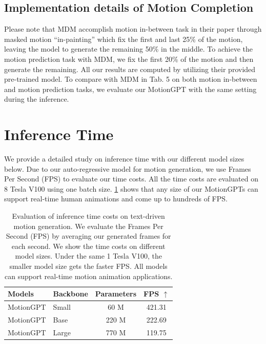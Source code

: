 \subsection{Implementation details of Motion Completion}
\label{sec:appendix:reimplement}
Please note that MDM\cite{mdm2022human} accomplish motion in-between task in their paper through masked motion “in-painting” which fix the first and last 25\% of the motion, leaving the model to generate the remaining 50\% in the middle. To achieve the motion prediction task with MDM, we fix the first 20\% of the motion and then generate the remaining. All our results are computed by utilizing their provided pre-trained model. To compare with MDM in Tab. 5 on both motion in-between and motion prediction tasks, we evaluate our MotionGPT with the same setting during the inference.


\section{Inference Time}
\label{sec:inferencetime}
%
We provide a detailed study on inference time with our different model sizes below. Due to our auto-regressive model for motion generation, we use Frames Per Second (FPS) to evaluate our time costs. All the time costs are evaluated on 8 Tesla V100 using one batch size. \cref{tab:tm:abl:scheduler} shows that any size of our MotionGPTs can support real-time human animations and come up to hundreds of FPS.

\begin{table}[h]
\centering
\resizebox{0.45\columnwidth}{!}
{%
\begin{tabular}{@{}llcc@{}}
\toprule
Models & Backbone&Parameters
& FPS $\uparrow$
\\ \midrule
MotionGPT & Small & 60 M 
& 421.31
\\
MotionGPT &Base & 220 M
& 222.69
\\
MotionGPT &Large & 770 M
& 119.75
\\
\bottomrule
\end{tabular}%
}
\vspace{5pt}
\caption{Evaluation of inference time costs on text-driven motion generation. We evaluate the Frames Per Second (FPS) by averaging our generated frames for each second. We show the time costs on different model sizes. Under the same 1 Tesla V100, the smaller model size gets the faster FPS. All models can support real-time motion animation applications.}
\vspace{-5pt}
\label{tab:tm:abl:scheduler}
\end{table}


